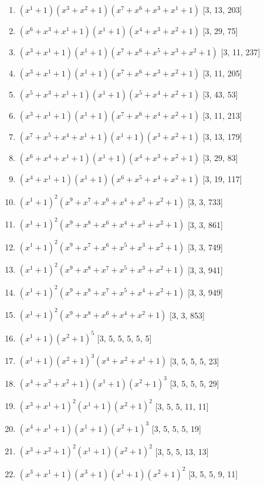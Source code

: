 \documentclass[10pt,twocolumn]{article}
\begin{document}
\begin{enumerate}
\item $(x^{1} + 1)(x^{3} + x^{2} + 1)(x^{7} + x^{6} + x^{3} + x^{1} + 1)$  [3, 13, 203]
\item $(x^{6} + x^{3} + x^{1} + 1)(x^{1} + 1)(x^{4} + x^{3} + x^{2} + 1)$  [3, 29, 75]
\item $(x^{3} + x^{1} + 1)(x^{1} + 1)(x^{7} + x^{6} + x^{5} + x^{3} + x^{2} + 1)$  [3, 11, 237]
\item $(x^{3} + x^{1} + 1)(x^{1} + 1)(x^{7} + x^{6} + x^{3} + x^{2} + 1)$  [3, 11, 205]
\item $(x^{5} + x^{3} + x^{1} + 1)(x^{1} + 1)(x^{5} + x^{4} + x^{2} + 1)$  [3, 43, 53]
\item $(x^{3} + x^{1} + 1)(x^{1} + 1)(x^{7} + x^{6} + x^{4} + x^{2} + 1)$  [3, 11, 213]
\item $(x^{7} + x^{5} + x^{4} + x^{1} + 1)(x^{1} + 1)(x^{3} + x^{2} + 1)$  [3, 13, 179]
\item $(x^{6} + x^{4} + x^{1} + 1)(x^{1} + 1)(x^{4} + x^{3} + x^{2} + 1)$  [3, 29, 83]
\item $(x^{4} + x^{1} + 1)(x^{1} + 1)(x^{6} + x^{5} + x^{4} + x^{2} + 1)$  [3, 19, 117]
\item $(x^{1} + 1)^{2}(x^{9} + x^{7} + x^{6} + x^{4} + x^{3} + x^{2} + 1)$  [3, 3, 733]
\item $(x^{1} + 1)^{2}(x^{9} + x^{8} + x^{6} + x^{4} + x^{3} + x^{2} + 1)$  [3, 3, 861]
\item $(x^{1} + 1)^{2}(x^{9} + x^{7} + x^{6} + x^{5} + x^{3} + x^{2} + 1)$  [3, 3, 749]
\item $(x^{1} + 1)^{2}(x^{9} + x^{8} + x^{7} + x^{5} + x^{3} + x^{2} + 1)$  [3, 3, 941]
\item $(x^{1} + 1)^{2}(x^{9} + x^{8} + x^{7} + x^{5} + x^{4} + x^{2} + 1)$  [3, 3, 949]
\item $(x^{1} + 1)^{2}(x^{9} + x^{8} + x^{6} + x^{4} + x^{2} + 1)$  [3, 3, 853]
\item $(x^{1} + 1)(x^{2} + 1)^{5}$  [3, 5, 5, 5, 5, 5]
\item $(x^{1} + 1)(x^{2} + 1)^{3}(x^{4} + x^{2} + x^{1} + 1)$  [3, 5, 5, 5, 23]
\item $(x^{4} + x^{3} + x^{2} + 1)(x^{1} + 1)(x^{2} + 1)^{3}$  [3, 5, 5, 5, 29]
\item $(x^{3} + x^{1} + 1)^{2}(x^{1} + 1)(x^{2} + 1)^{2}$  [3, 5, 5, 11, 11]
\item $(x^{4} + x^{1} + 1)(x^{1} + 1)(x^{2} + 1)^{3}$  [3, 5, 5, 5, 19]
\item $(x^{3} + x^{2} + 1)^{2}(x^{1} + 1)(x^{2} + 1)^{2}$  [3, 5, 5, 13, 13]
\item $(x^{3} + x^{1} + 1)(x^{3} + 1)(x^{1} + 1)(x^{2} + 1)^{2}$  [3, 5, 5, 9, 11]

\end{enumerate}
\end{document}
